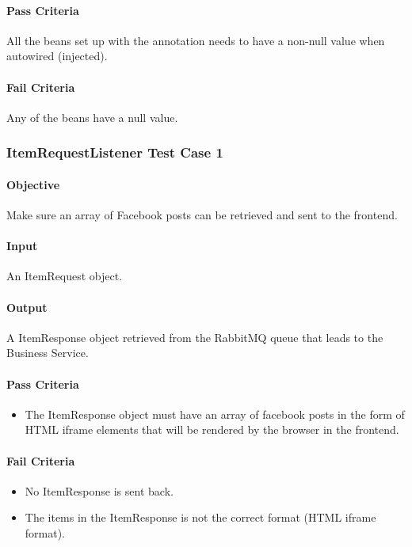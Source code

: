 \documentclass[hidelinks,english]{article}
\begin{document}
				\paragraph{Pass Criteria} All the beans set up with the \emph{\@Bean} annotation needs to have a non-null value when autowired (injected).
				\paragraph{Fail Criteria} Any of the beans have a null value.
				
			\subsubsection{ItemRequestListener Test Case 1}\label{facebookitemlistenertest1}
				\paragraph{Objective} Make sure an array of Facebook posts can be retrieved and sent to the frontend.
				\paragraph{Input} An ItemRequest object.
				\paragraph{Output} A ItemResponse object retrieved from the RabbitMQ queue that leads to the Business Service.
				\paragraph{Pass Criteria}
				\begin{itemize}
					\item The ItemResponse object must have an array of facebook posts in the form of HTML iframe elements that will be rendered by the browser in the frontend.
				\end{itemize}
				\paragraph{Fail Criteria}
				\begin{itemize}
					\item No ItemResponse is sent back.
					\item The items in the ItemResponse is not the correct format (HTML iframe format).
				\end{itemize}
				
\end{document}
